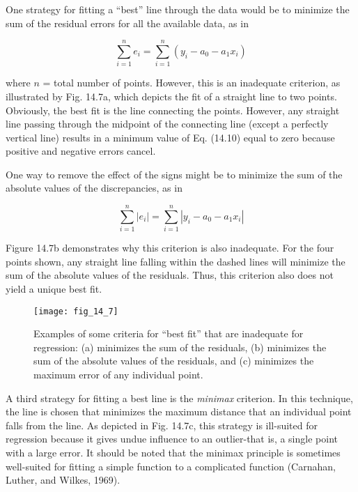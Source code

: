 \documentclass[../main.tex]{subfiles}
\begin{document}
\noindent One strategy for fitting a ``best'' line through the data would be to minimize the sum of the
residual errors for all the available data, as in

\begin{equation}
	\tag{14.10}
	\sum_{i=1}^n e_i = \sum^n_{i=1} (y_i - a_0 - a_1 x_i)
\end{equation}

where $n$ = total number of points. However, this is an inadequate criterion, as illustrated by
Fig. 14.7a, which depicts the fit of a straight line to two points. Obviously, the best fit is the
line connecting the points. However, any straight line passing through the midpoint of the
connecting line (except a perfectly vertical line) results in a minimum value of Eq. (14.10)
equal to zero because positive and negative errors cancel.

One way to remove the effect of the signs might be to minimize the sum of the absolute values of the discrepancies, as in

\begin{equation}
	\tag{14.11}
	\sum_{i=1}^n \left| e_i \right| = \sum^n_{i=1} \left| y_i - a_0 - a_1 x_i \right|
\end{equation}

\noindent Figure 14.7b demonstrates why this criterion is also inadequate. For the four points shown,
any straight line falling within the dashed lines will minimize the sum of the absolute values of the residuals. Thus, this criterion also does not yield a unique best fit.

\begin{figure}[H]
	\centering
	\texttt{[image: fig\_14\_7]} %
	\caption{\textsf{Examples of some criteria for ``best fit'' that are inadequate for regression: (a) minimizes the sum
	of the residuals, (b) minimizes the sum of the absolute values of the residuals, and (c) minimizes
	the maximum error of any individual point.}}
	\label{fig:fig_14_7}
\end{figure}

A third strategy for fitting a best line is the \textit{minimax} criterion. In this technique, the line
is chosen that minimizes the maximum distance that an individual point falls from the line.
As depicted in Fig. 14.7c, this strategy is ill-suited for regression because it gives undue
influence to an outlier-that is, a single point with a large error. It should be noted that
the minimax principle is sometimes well-suited for fitting a simple function to a complicated function (Carnahan, Luther, and Wilkes, 1969).
\end{document}
